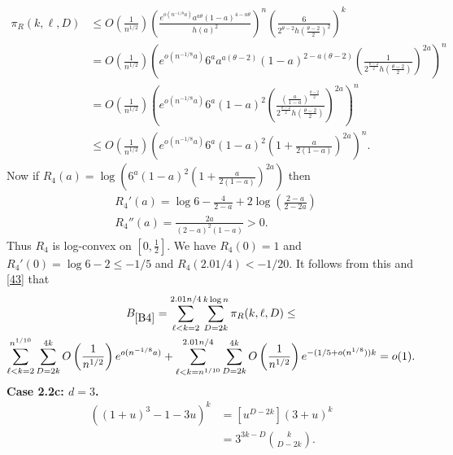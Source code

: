 \documentclass[11pt]{article}
\def\th{\theta}
\def\p{\pi}
\newcommand{\brac}[1]{\left(#1\right)}
\newcommand{\bfrac}[2]{\brac{\frac{#1}{#2}}}
\begin{document}
\begin{align*}
\p_R(k,\ell,D)&\leq O\bfrac{1}{n^{1/2}}\bfrac{e^{o(n^{-1/8}a)}a^{a\th}(1-a)^{4-a\th}}{h(a)^2}^n\bfrac{6}{2^{\th-2}h\bfrac{\th-2}{2}^2}^k\\
&=O\bfrac{1}{n^{1/2}}\brac{e^{o(n^{-1/8}a)}6^aa^{a(\th-2)}(1-a)^{2-a(\th-2)}\bfrac{1}{2^{\frac{\th-2}{2}}h\bfrac{\th-2}{2}}^{2a}}^n\\
&= O\bfrac{1}{n^{1/2}}\brac{e^{o(n^{-1/8}a)}6^a(1-a)^2\bfrac{\bfrac{a}{1-a}^{\frac{\th-2}{2}}}{2^{\frac{\th-2}{2}}h\bfrac{\th-2}{2}}^{2a}}^n\\
&\le O\bfrac{1}{n^{1/2}}\brac{e^{o(n^{-1/8}a)}6^a(1-a)^2\brac{1+\frac{a}{2(1-a)}}^{2a}}^n.
\end{align*}
Now if $R_4(a)=\log\brac{6^a(1-a)^2\brac{1+\frac{a}{2(1-a)}}^{2a}}$ then
\begin{align*}
&R_4'(a)=\log 6-\frac{4}{2-a}+2\log\bfrac{2-a}{2-2a}\\
&R_4''(a)=\frac{2a}{(2-a)^2(1-a)}>0.
\end{align*}
Thus $R_4$ is log-convex on $[0,\frac{1}{2}]$. We have $R_4(0)=1$ and $R_4'(0)=\log 6 -2\leq -1/5$
and $R_4(2.01/4)<-1/20$. It follows from this and \eqref{43} that
\begin{multline}\label{B4}
B_{\ref{B4}}=\sum_{\ell<k=2}^{2.01n/4}\sum_{D=2k}^{k\log n}
\p_R(k,\ell,D)\leq\\
\sum_{\ell<k=2}^{n^{1/10}}\sum_{D=2k}^{4k}O\bfrac{1}{n^{1/2}}e^{o(n^{-1/8}a)}
+\sum_{\ell<k=n^{1/10}}^{2.01n/4}\sum_{D=2k}^{4k}O\bfrac{1}{n^{1/2}}e^{-(1/5+o(n^{1/8}))k}=o(1).
\end{multline}
{\bf Case 2.2c: $d=3$.}
\begin{align*}
[u^D]((1+u)^3-1-3u)^k &= [u^{D-2k}](3+u)^k\\
&= 3^{3k-D}\binom{k}{D-2k}.
\end{align*}
\end{document}
